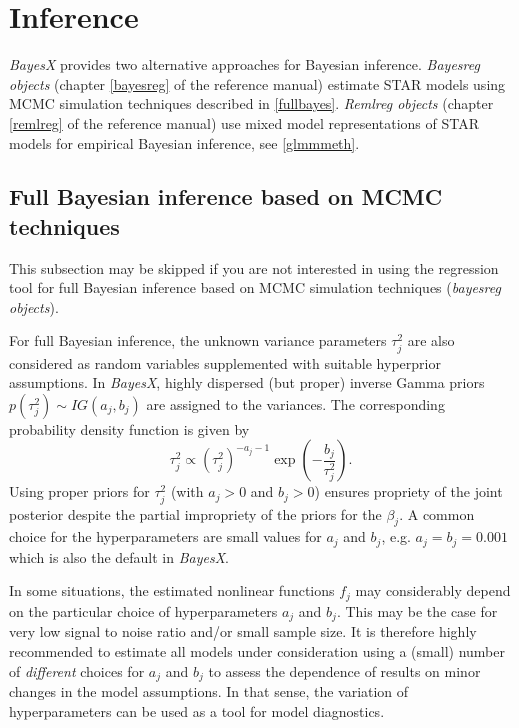 \documentclass[11pt,a4paper,twoside]{bayesxarticle}
\begin{document}
\section{Inference}
\label{inference}

{\em BayesX} provides two alternative approaches for Bayesian
inference. {\em Bayesreg objects} (chapter \ref*{bayesreg} of the
reference manual) estimate STAR models using MCMC simulation
techniques described in \autoref{fullbayes}. {\em Remlreg objects}
(chapter \ref*{remlreg} of the reference manual) use mixed model
representations of STAR models for empirical Bayesian inference, see
\autoref{glmmmeth}.



\subsection{Full Bayesian inference based on MCMC techniques}
\label{fullbayes}

This subsection may be skipped if you are not interested in using
the regression tool for full Bayesian inference based on MCMC
simulation techniques ({\em bayesreg objects}).

For full Bayesian inference, the unknown variance parameters
$\tau_j^2$ are also considered as random variables supplemented with
suitable hyperprior assumptions. In {\em BayesX}, highly dispersed
(but proper) inverse Gamma priors $p(\tau^2_j) \sim IG(a_j,b_j)$ are
assigned to the variances. The corresponding probability density
function is given by
$$
 \tau_j^2 \propto (\tau^2_j)^{-a_j-1}\exp\left(-\frac{b_j}{\tau^2_j}\right).
$$
Using proper priors for $\tau_j^2$ (with $a_j>0$ and $b_j>0$)
ensures propriety of the joint posterior despite the partial
impropriety of the priors for the $\beta_j$. A common choice for the
hyperparameters are small values for $a_j$ and $b_j$, e.g.
$a_j=b_j=0.001$ which is also the default in {\em BayesX}.

In some situations, the estimated nonlinear functions $f_j$ may
considerably depend on the particular choice of hyperparameters
$a_j$ and $b_j$. This may be the case for very low signal to noise
ratio and/or small sample size. It is therefore highly recommended
to estimate all models under consideration using a (small) number of
{\em different} choices for $a_j$ and $b_j$ to assess the dependence
of results on minor changes in the model assumptions. In that sense,
the variation of hyperparameters can be used as a tool for model
diagnostics.
\end{document}
